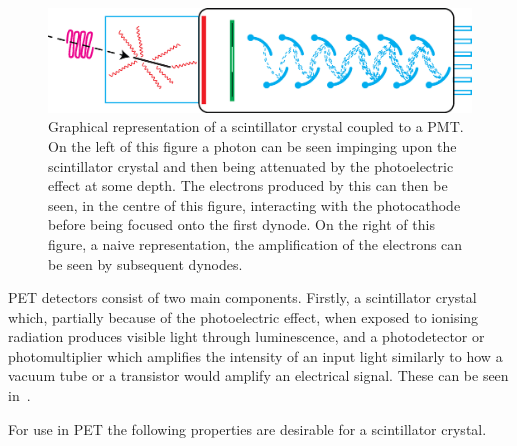                 \begin{figure}
                    \centering
                    
                    \includegraphics[width=1.0\linewidth]{figures/background_photomultiplier.png}
                    
                    \captionsetup{singlelinecheck=false, justification=raggedright}
                    \caption{Graphical representation of a scintillator crystal coupled to a \gls{PMT}. On the left of this figure a photon can be seen impinging upon the scintillator crystal and then being attenuated by the photoelectric effect at some depth. The electrons produced by this can then be seen, in the centre of this figure, interacting with the photocathode before being focused onto the first dynode. On the right of this figure, a naive representation, the amplification of the electrons can be seen by subsequent dynodes.} \label{fig:photon_detection_photomultiplier}
                \end{figure}
                
                PET detectors consist of two main components. Firstly, a scintillator crystal which, partially because of the photoelectric effect, when exposed to ionising radiation produces visible light through luminescence, and a photodetector or photomultiplier which amplifies the intensity of an input light similarly to how a vacuum tube or a transistor would amplify an electrical signal. These can be seen in~.
                
                For use in \gls{PET} the following properties are desirable for a scintillator crystal.
                
